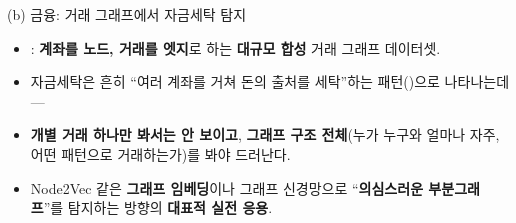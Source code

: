 \begin{frame}{(b) 금융: 거래 그래프에서 자금세탁 탐지}
  \begin{itemize}
    \item {}: \textbf{계좌를 노드, 거래를 엣지}로
      하는 \textbf{대규모 합성} 거래 그래프 데이터셋.
    \item 자금세탁은 흔히 ``여러 계좌를 거쳐 돈의 출처를 세탁''하는
      패턴()으로 나타나는데 ---
    \item \textbf{개별 거래 하나만 봐서는 안 보이고},
      \textbf{그래프 구조 전체}(누가 누구와 얼마나 자주, 어떤 패턴으로
      거래하는가)를 봐야 드러난다.
    \item Node2Vec 같은 \textbf{그래프 임베딩}이나 그래프 신경망으로
      ``\textbf{의심스러운 부분그래프}''를 탐지하는 방향의
      \textbf{대표적 실전 응용}.
  \end{itemize}
\end{frame}

